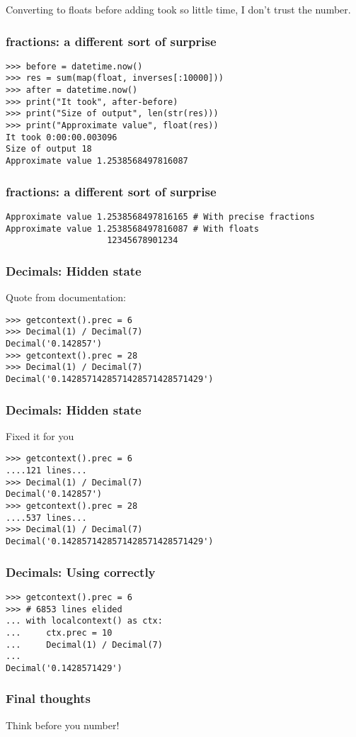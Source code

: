 Converting to floats before adding took so little time,
I don't trust the number.

\begin{frame}[fragile]
\frametitle{fractions: a different sort of surprise}

\begin{lstlisting}
>>> before = datetime.now()
>>> res = sum(map(float, inverses[:10000]))
>>> after = datetime.now()
>>> print("It took", after-before)
>>> print("Size of output", len(str(res)))
>>> print("Approximate value", float(res))
It took 0:00:00.003096
Size of output 18
Approximate value 1.2538568497816087
\end{lstlisting}
\end{frame}

\begin{frame}[fragile]
\frametitle{fractions: a different sort of surprise}

\begin{lstlisting}
Approximate value 1.2538568497816165 # With precise fractions
Approximate value 1.2538568497816087 # With floats
                    12345678901234
\end{lstlisting}
\end{frame}

\begin{frame}[fragile]
\frametitle{Decimals: Hidden state}

Quote from documentation:

\begin{lstlisting}
>>> getcontext().prec = 6
>>> Decimal(1) / Decimal(7)
Decimal('0.142857')
>>> getcontext().prec = 28
>>> Decimal(1) / Decimal(7)
Decimal('0.1428571428571428571428571429')
\end{lstlisting}

\end{frame}

\begin{frame}[fragile]
\frametitle{Decimals: Hidden state}

Fixed it for you

\begin{lstlisting}
>>> getcontext().prec = 6
....121 lines...
>>> Decimal(1) / Decimal(7)
Decimal('0.142857')
>>> getcontext().prec = 28
....537 lines...
>>> Decimal(1) / Decimal(7)
Decimal('0.1428571428571428571428571429')
\end{lstlisting}

\end{frame}

\begin{frame}[fragile]
\frametitle{Decimals: Using correctly}

\begin{lstlisting}
>>> getcontext().prec = 6
>>> # 6853 lines elided
... with localcontext() as ctx:
...     ctx.prec = 10
...     Decimal(1) / Decimal(7)
... 
Decimal('0.1428571429')
\end{lstlisting}

\end{frame}

\begin{frame}
\frametitle{Final thoughts}

Think before you number!
\end{frame}


